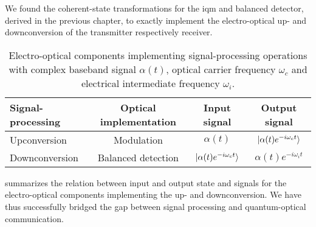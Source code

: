 We found the coherent-state transformations for the \gls{iqm} and balanced detector, derived in the previous chapter, to exactly implement the electro-optical up- and downconversion of the transmitter respectively receiver.
\begin{table}[htb]
  \centering
  \begin{tabular}{lccc}
    \toprule
    Signal-processing & Optical implementation & Input signal & Output signal \\
    \midrule
    Upconversion & Modulation & $\alpha(t)$ & $\lvert\alpha(t)e^{-i\omega_c t}\rangle$ \\
    Downconversion & Balanced detection & $\lvert\alpha(t)e^{-i\omega_c t}\rangle$ & $\alpha(t)e^{-i\omega_it}$ \\
    \bottomrule
  \end{tabular}
  \caption{Electro-optical components implementing signal-processing operations with complex baseband signal $\alpha(t)$, optical carrier frequency $\omega_c$ and electrical intermediate frequency $\omega_i$.}\label{tab:electro_optical_signal_processing}
\end{table}
 summarizes the relation between input and output state and signals for the electro-optical components implementing the up- and downconversion.
We have thus successfully bridged the gap between signal processing and quantum-optical communication.